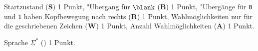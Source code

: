 \begin{bewertung}
\begin{teilaufgaben}
\item
Startzustand ({\bf S}) 1 Punkt,
"Ubergang für $\blank$ ({\bf B}) 1 Punkt,
"Ubergänge für \texttt{0} und \texttt{1} haben Kopfbewegung nach rechts
({\bf R}) 1 Punkt,
Wahlmöglichkeiten nur für die geschriebenen Zeichen ({\bf W}) 1 Punkt,
Anzahl Wahlmöglichkeiten ({\bf A}) 1 Punkt.
\item
Sprache $\Sigma^*$ ({\bf *}) 1 Punkt.
\end{teilaufgaben}
\end{bewertung}


